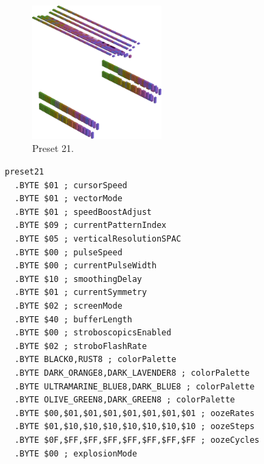 \clearpage
\begin{minipage}[b]{0.48\linewidth}
\begin{figure}[H]                                                          
  \centering                                                             
  \begin{adjustbox}{width=5cm,center}                                   
  \includegraphics[width=5cm]{src/colorspace_presets/preset21-45.png}%
  \end{adjustbox}                                                        
\caption*{Preset 21.}                                           
\end{figure}                                                               
\end{minipage}
\hspace{0.1cm}
\begin{minipage}[b]{0.48\linewidth}                            
\begin{lstlisting}[basicstyle=\ttfamily\tiny]
preset21
  .BYTE $01 ; cursorSpeed
  .BYTE $01 ; vectorMode
  .BYTE $01 ; speedBoostAdjust
  .BYTE $09 ; currentPatternIndex
  .BYTE $05 ; verticalResolutionSPAC
  .BYTE $00 ; pulseSpeed
  .BYTE $00 ; currentPulseWidth
  .BYTE $10 ; smoothingDelay
  .BYTE $01 ; currentSymmetry
  .BYTE $02 ; screenMode
  .BYTE $40 ; bufferLength
  .BYTE $00 ; stroboscopicsEnabled
  .BYTE $02 ; stroboFlashRate
  .BYTE BLACK0,RUST8 ; colorPalette
  .BYTE DARK_ORANGE8,DARK_LAVENDER8 ; colorPalette
  .BYTE ULTRAMARINE_BLUE8,DARK_BLUE8 ; colorPalette
  .BYTE OLIVE_GREEN8,DARK_GREEN8 ; colorPalette
  .BYTE $00,$01,$01,$01,$01,$01,$01,$01 ; oozeRates
  .BYTE $01,$10,$10,$10,$10,$10,$10,$10 ; oozeSteps
  .BYTE $0F,$FF,$FF,$FF,$FF,$FF,$FF,$FF ; oozeCycles
  .BYTE $00 ; explosionMode
\end{lstlisting}
\end{minipage}

\vspace*{-0.5cm}

